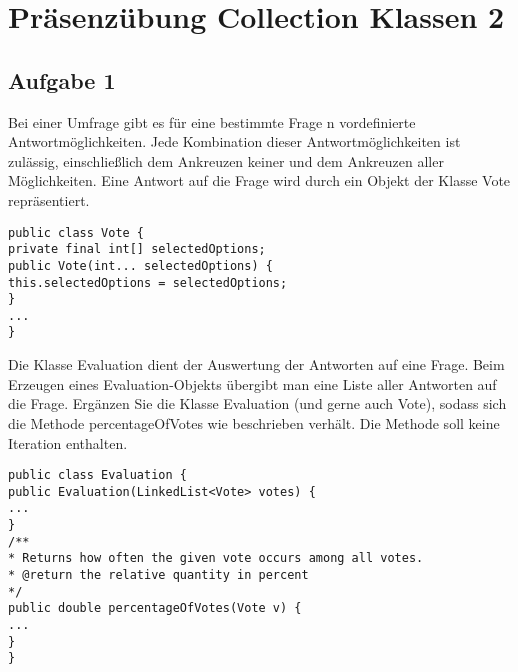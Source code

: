 \chapter{Präsenzübung Collection Klassen 2}

\section{Aufgabe 1}
Bei einer Umfrage gibt es für eine bestimmte Frage n vordefinierte Antwortmöglichkeiten. Jede
Kombination dieser Antwortmöglichkeiten ist zulässig, einschließlich dem Ankreuzen keiner und
dem Ankreuzen aller Möglichkeiten. Eine Antwort auf die Frage wird durch ein Objekt der Klasse
Vote repräsentiert.

\begin{lstlisting}
public class Vote {
private final int[] selectedOptions;
public Vote(int... selectedOptions) {
this.selectedOptions = selectedOptions;
}
...
}
\end{lstlisting}

Die Klasse Evaluation dient der Auswertung der Antworten auf eine Frage. Beim Erzeugen eines
Evaluation-Objekts übergibt man eine Liste aller Antworten auf die Frage.
Ergänzen Sie die Klasse Evaluation (und gerne auch Vote), sodass sich die Methode percentageOfVotes
wie beschrieben verhält. Die Methode soll keine Iteration enthalten.

\begin{lstlisting}
public class Evaluation {
public Evaluation(LinkedList<Vote> votes) {
...
}
/**
* Returns how often the given vote occurs among all votes.
* @return the relative quantity in percent
*/
public double percentageOfVotes(Vote v) {
...
}
}
\end{lstlisting}